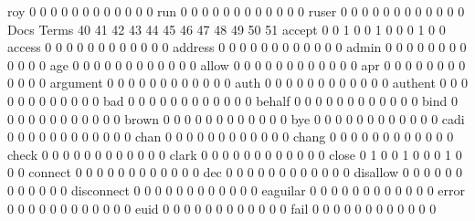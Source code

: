 \documentclass[compress,8pt]{beamer}
\begin{document}
\begin{frame}
\begin{Schunk}
  roy                                       0  0  0  0  0  0  0  0  0  0  0  0
  run                                       0  0  0  0  0  0  0  0  0  0  0  0
  ruser                                     0  0  0  0  0  0  0  0  0  0  0  0
                                          Docs
Terms                                      40 41 42 43 44 45 46 47 48 49 50 51
  accept                                    0  0  1  0  0  1  0  0  0  1  0  0
  access                                    0  0  0  0  0  0  0  0  0  0  0  0
  address                                   0  0  0  0  0  0  0  0  0  0  0  0
  admin                                     0  0  0  0  0  0  0  0  0  0  0  0
  age                                       0  0  0  0  0  0  0  0  0  0  0  0
  allow                                     0  0  0  0  0  0  0  0  0  0  0  0
  apr                                       0  0  0  0  0  0  0  0  0  0  0  0
  argument                                  0  0  0  0  0  0  0  0  0  0  0  0
  auth                                      0  0  0  0  0  0  0  0  0  0  0  0
  authent                                   0  0  0  0  0  0  0  0  0  0  0  0
  bad                                       0  0  0  0  0  0  0  0  0  0  0  0
  behalf                                    0  0  0  0  0  0  0  0  0  0  0  0
  bind                                      0  0  0  0  0  0  0  0  0  0  0  0
  brown                                     0  0  0  0  0  0  0  0  0  0  0  0
  bye                                       0  0  0  0  0  0  0  0  0  0  0  0
  cadi                                      0  0  0  0  0  0  0  0  0  0  0  0
  chan                                      0  0  0  0  0  0  0  0  0  0  0  0
  chang                                     0  0  0  0  0  0  0  0  0  0  0  0
  check                                     0  0  0  0  0  0  0  0  0  0  0  0
  clark                                     0  0  0  0  0  0  0  0  0  0  0  0
  close                                     0  1  0  0  1  0  0  0  1  0  0  0
  connect                                   0  0  0  0  0  0  0  0  0  0  0  0
  dec                                       0  0  0  0  0  0  0  0  0  0  0  0
  disallow                                  0  0  0  0  0  0  0  0  0  0  0  0
  disconnect                                0  0  0  0  0  0  0  0  0  0  0  0
  eaguilar                                  0  0  0  0  0  0  0  0  0  0  0  0
  error                                     0  0  0  0  0  0  0  0  0  0  0  0
  euid                                      0  0  0  0  0  0  0  0  0  0  0  0
  fail                                      0  0  0  0  0  0  0  0  0  0  0  0

\end{Schunk}
\end{frame}
\end{document}
